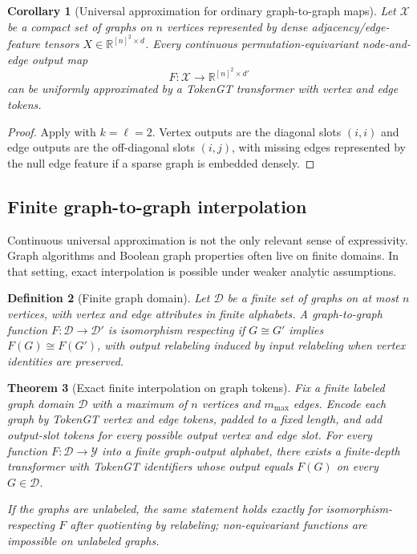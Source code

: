 \documentclass[11pt]{article}
\newtheorem{theorem}{Theorem}[section]
\newtheorem{corollary}[theorem]{Corollary}
\newtheorem{definition}[theorem]{Definition}
\newcommand{\R}{\mathbb{R}}
\newcommand{\cX}{\mathcal{X}}
\newcommand{\cY}{\mathcal{Y}}
\newcommand{\cD}{\mathcal{D}}
\begin{document}
\begin{corollary}[Universal approximation for ordinary graph-to-graph maps]
\label{cor:ordinary}
Let $\cX$ be a compact set of graphs on $n$ vertices represented by dense adjacency/edge-feature tensors $X\in\R^{[n]^2\times d}$.  Every continuous permutation-equivariant node-and-edge output map
\[
  F:\cX\to \R^{[n]^2\times d'}
\]
can be uniformly approximated by a TokenGT transformer with vertex and edge tokens.
\end{corollary}

\begin{proof}
Apply  with $k=\ell=2$.  Vertex outputs are the diagonal slots $(i,i)$ and edge outputs are the off-diagonal slots $(i,j)$, with missing edges represented by the null edge feature if a sparse graph is embedded densely.
\end{proof}

\subsection{Finite graph-to-graph interpolation}

Continuous universal approximation is not the only relevant sense of expressivity.  Graph algorithms and Boolean graph properties often live on finite domains.  In that setting, exact interpolation is possible under weaker analytic assumptions.

\begin{definition}[Finite graph domain]
Let $\cD$ be a finite set of graphs on at most $n$ vertices, with vertex and edge attributes in finite alphabets.  A graph-to-graph function $F:\cD\to\cD'$ is \emph{isomorphism respecting} if $G\cong G'$ implies $F(G)\cong F(G')$, with output relabeling induced by input relabeling when vertex identities are preserved.
\end{definition}

\begin{theorem}[Exact finite interpolation on graph tokens]
\label{thm:finite-interp}
Fix a finite labeled graph domain $\cD$ with a maximum of $n$ vertices and $m_{\max}$ edges.  Encode each graph by TokenGT vertex and edge tokens, padded to a fixed length, and add output-slot tokens for every possible output vertex and edge slot.  For every function $F:\cD\to\cY$ into a finite graph-output alphabet, there exists a finite-depth transformer with TokenGT identifiers whose output equals $F(G)$ on every $G\in\cD$.

If the graphs are unlabeled, the same statement holds exactly for isomorphism-respecting $F$ after quotienting by relabeling; non-equivariant functions are impossible on unlabeled graphs.
\end{theorem}
\end{document}
